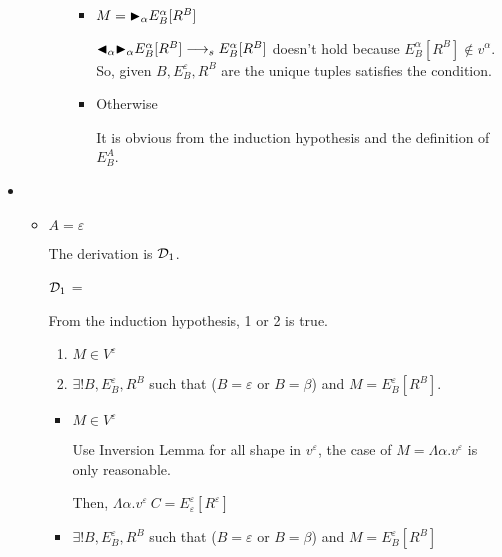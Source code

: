 \begin{itemize}
\begin{itemize}
\begin{itemize}
			                  \begin{itemize}
				                  \item $ M = {\mathop{\blacktriangleright}}_\alpha E^\alpha_B[R^B] $

				                        $ {\mathop{\blacktriangleleft}}_\alpha {\mathop{\blacktriangleright}}_\alpha E^\alpha_B[R^B] \longrightarrow_s E^\alpha_B[R^B]$ doesn't hold because $ E^\alpha_B[R^B] \notin v^\alpha$.
				                        So, given $B, E^\varepsilon_B, R^B$ are the unique tuples satisfies the condition.
				                  \item Otherwise

				                        It is obvious from the induction hypothesis and the definition of $E^A_B$.
			                  \end{itemize}
		            \end{itemize}

	      \end{itemize}

	\item \TIns

	      \begin{itemize}
		      \item $ A = \varepsilon$

		            The derivation is $\mathcal{D}_1$.

		            $\mathcal{D}_1$ = 
		            {}

		            From the induction hypothesis, 1 or 2 is true.

		            \begin{enumerate}
			            \item $ M \in V^\varepsilon$
			            \item $\exists ! B, E^\varepsilon_B, R^B$ such that ($B = \varepsilon$ or $B = \beta$) and $M = E^\varepsilon_B[R^B]$.
		            \end{enumerate}

		            \begin{itemize}
			            \item $ M \in V^\varepsilon$

			                  Use Inversion Lemma for all shape in $v^\varepsilon$, the case of $ M = \Lambda\alpha.v^\varepsilon$ is only reasonable.

			                  Then, $ \Lambda\alpha.v^\varepsilon\ C = E^\varepsilon_\varepsilon [R^\varepsilon]$
			            \item $\exists ! B, E^\varepsilon_B, R^B$ such that ($B = \varepsilon$ or $B = \beta$) and $M = E^\varepsilon_B[R^B]$


\end{itemize}
\end{itemize}
\end{itemize}
